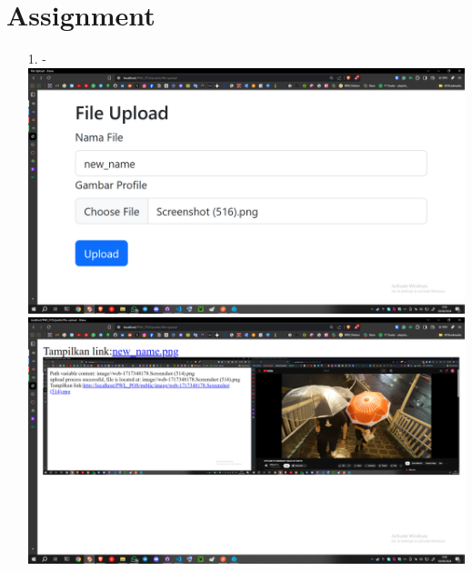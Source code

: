 \documentclass[12pt,titlepage]{article}
\begin{document}
\section{Assignment}
\begin{enumerate}
    \item[1.] - \\ \includegraphics[width=.9\textwidth]{images/figures/Screenshot (519).png} \\ \includegraphics[width=.9\textwidth]{images/figures/Screenshot (520).png}
\end{enumerate}
\end{document}

